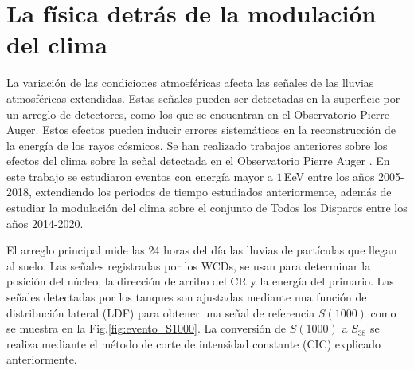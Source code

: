 
\section{La física detrás de la modulación del clima}\label{seccion:fisica_clima}

La variación de las condiciones atmosféricas afecta las señales de las lluvias atmosféricas extendidas. Estas señales pueden ser detectadas en la superficie por un arreglo de detectores, como los que se encuentran en el Observatorio Pierre Auger. Estos efectos pueden inducir errores sistemáticos en la reconstrucción de la energía de los rayos cósmicos. Se han realizado  trabajos anteriores sobre los efectos del clima sobre la señal detectada en el Observatorio Pierre Auger \cite{aab2017impact} \cite{collaboration2009atmospheric} . En este trabajo se estudiaron eventos con energía mayor a $1\,$EeV entre los años 2005-2018, extendiendo los periodos de tiempo estudiados anteriormente, además de estudiar la modulación del clima sobre el conjunto  de Todos los Disparos entre los años 2014-2020.


El arreglo principal mide las 24 horas del día las lluvias de partículas que llegan al suelo. Las señales registradas por los WCDs, se usan para determinar la posición del núcleo, la dirección de arribo del CR y la energía del primario. Las señales detectadas por los tanques son ajustadas mediante una función de distribución lateral (LDF) para obtener una señal de referencia $S(1000)$ como se muestra en la Fig.\ref{fig:evento_S1000}.
La conversión de $S(1000)$ a $S_{38}$ se realiza mediante el método de corte de intensidad constante (CIC) explicado anteriormente.%

